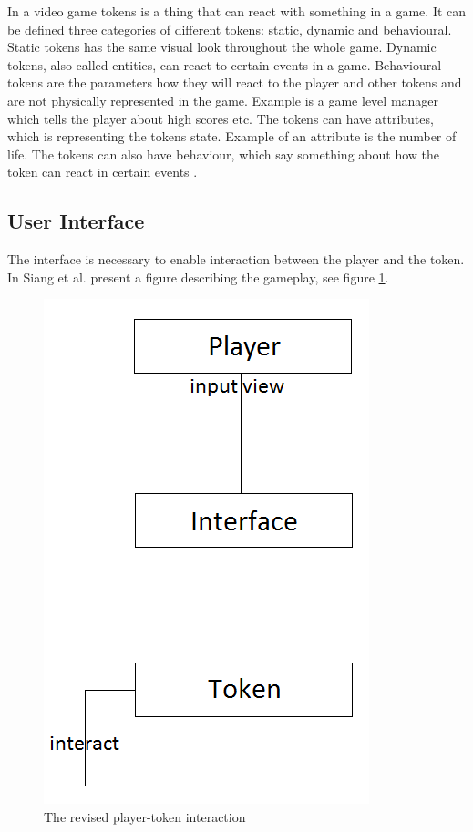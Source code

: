 In a video game tokens is a thing that can react with something in a game. It can be defined three categories of different tokens: static, dynamic and behavioural. Static tokens has the same visual look throughout the whole game. Dynamic tokens, also called entities, can react to certain events in a game. Behavioural tokens are the parameters how they will react to the player and other tokens and are not physically represented in the game. Example is a game level manager which tells the player about high scores etc. The tokens can have attributes, which is representing the tokens state. Example of an attribute is the number of life. The tokens can also have behaviour, which say something about how the token can react in certain events \cite{umlapproach}.

\subsection{User Interface}
The interface is necessary to enable interaction between the player and the token. In \cite{umlapproach} Siang et al. present a figure describing the gameplay, see figure \ref{fig:playerinterface}.

\begin{figure}
\begin{center}
\includegraphics[scale=0.5]{playerinterface}
\caption[The revised player-token interaction]{The revised player-token interaction \cite{umlapproach}}
\label{fig:playerinterface}
\end{center}
\end{figure} 

